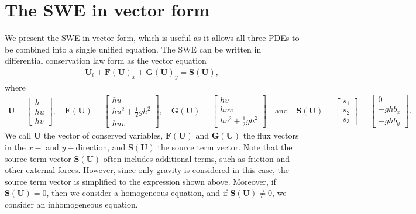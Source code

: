 \section{The SWE in vector form}
We present the SWE in vector form, which is useful as it allows all three PDEs to be combined into a single unified equation.
The SWE can be written in differential conservation law form as the vector equation
\begin{align}\label{eq:vector_form_2D}
    \mathbf{U}_t + \mathbf{F(U)}_x + \mathbf{G(U)}_y = \mathbf{S(U)},
\end{align}
where 
\begin{align*}
    \mathbf{U} = \begin{bmatrix}
        h \\
        hu \\
        hv
    \end{bmatrix},
    \quad 
    \mathbf{F(U)} = \begin{bmatrix}
        hu \\
        hu^2 + \frac{1}{2}gh^2 \\
        huv
    \end{bmatrix},
    \quad
    \mathbf{G(U)} = \begin{bmatrix}
        hv \\
        huv \\
        hv^2 + \frac{1}{2}gh^2
    \end{bmatrix}
    \quad \text{and} \quad
    \mathbf{S(U)} = \begin{bmatrix}
        s_1 \\
        s_2 \\
        s_3
    \end{bmatrix} = 
    \begin{bmatrix}
        0 \\
        -gh b_x \\
        -gh b_y
    \end{bmatrix}
    .
\end{align*}
We call $\mathbf{U}$ the vector of conserved variables, $\mathbf{F(U)}$ and $\mathbf{G(U)}$ the flux vectors in the $x-$ and $y-$direction, and $\mathbf{S(U)}$ the source term vector.
Note that the source term vector $\mathbf{S(U)}$ often includes additional terms, such as friction and other external forces.
However, since only gravity is considered in this case, the source term vector is simplified to the expression shown above.
Moreover, if $\mathbf{S(U)} = 0$, then we consider a homogeneous equation, and if $\mathbf{S(U)} \neq 0$, we consider an inhomogeneous equation.

